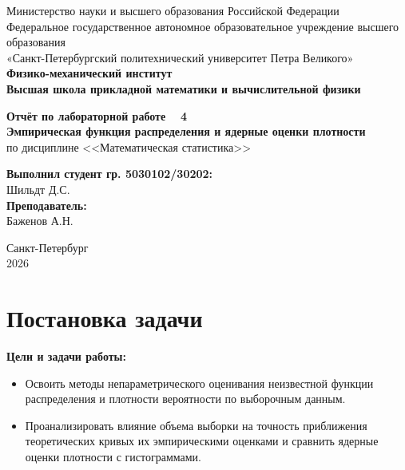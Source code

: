 \documentclass[a4paper, 14pt]{extarticle}
\begin{document}
\begin{titlepage}
    \begin{center}
        Министерство науки и высшего образования Российской Федерации\\
        Федеральное государственное автономное образовательное учреждение высшего образования\\
        «Санкт-Петербургский политехнический университет Петра Великого»\\
        
        \textbf{Физико-механический институт}\\
        \textbf{Высшая школа прикладной математики и вычислительной физики}
    \end{center}

    \vfill
    
    \begin{center}
        \textbf{Отчёт по лабораторной работе \textnumero~ 4\\[0.5cm]}
        \textbf{ Эмпирическая функция распределения и ядерные оценки плотности\\}
        по дисциплине <<Математическая статистика>>
    \end{center}

    \vfill

    \hfill
    \begin{minipage}{0.45\textwidth}
        \textbf{Выполнил студент гр. 5030102/30202:}\\
        Шильдт Д.С.\\[0.5cm]
        \textbf{Преподаватель:}\\ 
        Баженов А.Н.
    \end{minipage}

    \vfill

    \begin{center}
        Санкт-Петербург\\2026
    \end{center}
\end{titlepage}

\setcounter{page}{2}

\tableofcontents
\newpage

\section{Постановка задачи}

\textbf{Цели и задачи работы:}
\begin{itemize}
    \item Освоить методы непараметрического оценивания неизвестной функции распределения и плотности вероятности по выборочным данным.
    \item Проанализировать влияние объема выборки на точность приближения теоретических кривых их эмпирическими оценками и сравнить ядерные оценки плотности с гистограммами.
\end{itemize}
\end{document}
